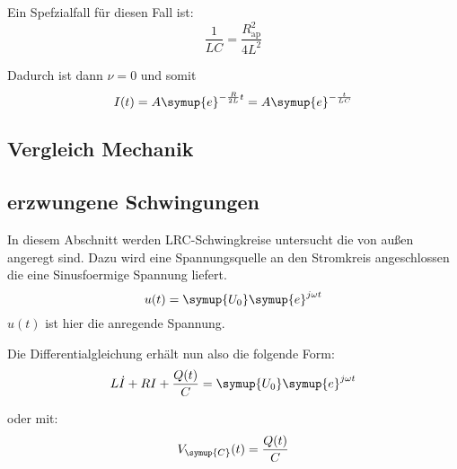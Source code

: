         Ein Spefzialfall für diesen Fall ist:
        \begin{equation}
            \frac{1}{LC} = \frac{R^2_{\text{ap}}}{4L^2} \nonumber
        \end{equation}
        
        Dadurch ist dann $\nu = 0$ und somit
        \begin{equation}
            I(t) = A \symup{e}^{-\frac{R}{2L}t} = A \symup{e}^{-\frac{t}{LC}} \nonumber
        \end{equation}

        \subsection{Vergleich Mechanik}


    \subsection{erzwungene Schwingungen}
    
    In diesem Abschnitt werden LRC-Schwingkreise untersucht die von außen angeregt sind. Dazu wird eine Spannungsquelle an den Stromkreis 
    angeschlossen die eine Sinusfoermige Spannung liefert.
    \begin{equation}
        u(t)= \symup{U_0} \symup{e}^{j \omega t} \nonumber
    \end{equation}
    $u(t)$ ist hier die anregende Spannung.

    Die Differentialgleichung erhält nun also die folgende Form:
    \begin{equation}
        L \dot{I} + R I + \frac{Q(t)}{C} = \symup{U_0} \symup{e}^{j \omega t} \nonumber
    \end{equation}

    oder mit:
    \begin{equation}
        V_{\symup{C}} (t) = \frac{Q(t)}{C} \nonumber
    \end{equation}

